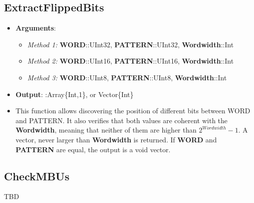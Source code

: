 \subsection*{ExtractFlippedBits}
\begin {itemize}
	\item \textbf{Arguments}:
		\begin{itemize}
			\item \textit{Method 1: }\textbf{WORD}::UInt32, \textbf{PATTERN}::UInt32, \textbf{Wordwidth}::Int
			\item \textit{Method 2: }\textbf{WORD}::UInt16, \textbf{PATTERN}::UInt16, \textbf{Wordwidth}::Int
			\item \textit{Method 3: }\textbf{WORD}::UInt8, \textbf{PATTERN}::UInt8, \textbf{Wordwidth}::Int
		\end{itemize}
	\item \textbf{Output}: :Array\{Int,1\}, or Vector\{Int\}
	\item This function allows discovering the position of different bits between WORD
	 and PATTERN. It also verifies that both values are coherent with the \textbf{Wordwidth},
	 meaning that neither of them are higher than \(2^{Wordwidth}-1\). A vector, never larger than \textbf{Wordwidth} is returned. If \textbf{WORD} and \textbf{PATTERN} are equal, the output is a void vector.
\end{itemize}

\subsection*{CheckMBUs}

TBD

